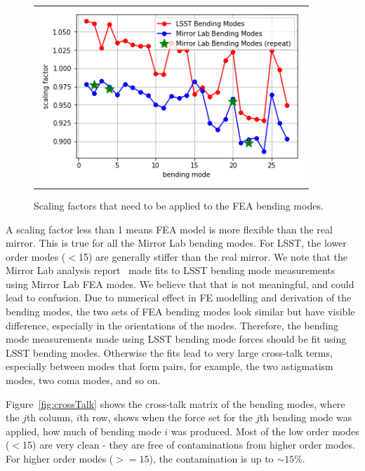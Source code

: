 \documentclass [twoside,openbib,12pt]{article}
\begin{document}
 \begin{figure}[bthp]
   \begin{center}
     \begin{tabular}{c}
\includegraphics[width=100mm]{figures/scalingF.png}
  \end{tabular}
   \end{center}
   \caption
  { \label{fig:scalingF}
Scaling factors that need to be applied to the FEA bending modes.
 }
\end{figure}


A scaling factor less than 1 means FEA model is more flexible
than the real mirror. This is true for all the Mirror Lab bending modes.
For LSST, the lower order modes ($<$15) are generally stiffer than the real
mirror. We note that the Mirror Lab analysis report~\cite{m1m3UAreport} made fits
to LSST bending mode measurements using Mirror Lab FEA modes. We
believe that that is not meaningful, and could lead to confusion. Due
to numerical effect in FE modelling and derivation of the bending
modes, the two sets of FEA bending modes look similar but have visible
difference, especially in the orientations of the modes. Therefore, the
bending mode measurements made using LSST bending mode forces should be fit using
LSST bending modes. Otherwise the fits lead to very large cross-talk
terms, especially between modes that form pairs, for example, the two astigmatism modes, two coma modes, and so on.

Figure~\ref{fig:crossTalk} shows the cross-talk matrix of the bending
modes, where the $j$th column, $i$th row, shows when the force set for
the $j$th bending mode was applied, how much of bending mode $i$ was produced.
Most of the low order modes ($<$15) are very clean - they are free of
contaminations from higher order modes.
For higher order modes ($>=15$), the contamination is up to $\sim 15\%$.
\end{document}
